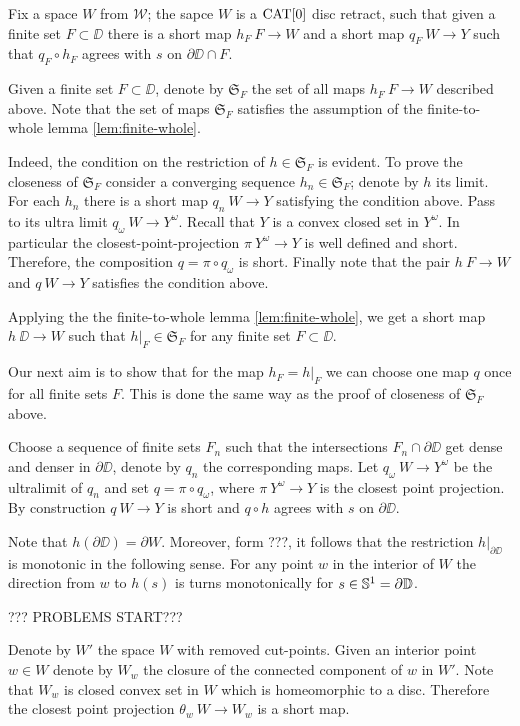 \documentclass{article}
\begin{document}
Fix a space $W$ from $\mathcal{W}$;
the sapce $W$ is a $\mathop{\rm CAT}\nolimits[0]$ disc retract,
such that given a finite set $F\subset \DD$ there is a short map $h_F\:F\to W$ 
and a short map $q_F\:W\to Y$ such that $q_F\circ h_F$ agrees with $s$ on $\partial\DD\cap F$.

Given a finite set $F\subset \DD$,
denote by $\mathfrak{S}_F$ the set of all maps $h_F\:F\to W$ described above.
Note that the set of maps $\mathfrak{S}_F$ satisfies the assumption of the finite-to-whole lemma \ref{lem:finite-whole}.

Indeed, the condition on the restriction of $h\in  \mathfrak{S}_F$ is evident.
To prove the closeness of $\mathfrak{S}_F$ consider a converging sequence $h_n\in  \mathfrak{S}_F$;
denote by $h$ its limit.
For each $h_n$ there is a short map $q_n\:W\to Y$ satisfying the condition above.
Pass to its ultra limit $q_\omega\:W\to Y^\omega$.
Recall that $Y$ is a convex closed set in $Y^\omega$.
In particular the closest-point-projection $\pi\:Y^\omega\to Y$ is well defined and short.
Therefore, the composition $q=\pi\circ q_\omega$ is short.
Finally note that the pair $h\:F\to W$ and $q\:W\to Y$ satisfies the condition above.

Applying the the finite-to-whole lemma \ref{lem:finite-whole},
we get a short map $h\:\DD\to W$ such that $h|_F\in \mathfrak{S}_F$
for any finite set $F\subset \DD$.

Our next aim is to show that for the map $h_F=h|_F$ we can choose one map $q$ once for all finite sets $F$.
This is done the same way as the proof of closeness of $\mathfrak{S}_F$ above.

Choose a sequence of finite sets $F_n$ such that the intersections $F_n\cap\partial \DD$ get dense and denser in $\partial \DD$, denote by $q_n$ the corresponding maps.
Let $q_\omega\:W\to Y^\omega$ be the ultralimit of $q_n$ and set $q=\pi\circ q_\omega$,
where $\pi\:Y^\omega\to Y$ is the closest point projection.
By construction $q\:W\to Y$ is short and $q\circ h$ agrees with $s$ on $\partial \DD$.

Note that $h(\partial\DD)= \partial W$.
Moreover, form ???, it follows that the restriction $h|_{\partial\DD}$ is monotonic in the following sense.
For any point $w$ in the interior of $W$ the direction from $w$ to $h(s)$ is turns monotonically for $s\in \mathbb{S}^1=\partial\mathbb{D}$.

??? PROBLEMS START???

Denote by $W'$ the space $W$ with removed cut-points.
Given an interior point $w\in W$ denote by $W_w$ the closure of the connected component of $w$ in $W'$.
Note that $W_w$ is closed convex set in $W$ which is homeomorphic to a disc.
Therefore the closest point projection $\theta_w\:W\to W_w$ is a short map.
\end{document}
